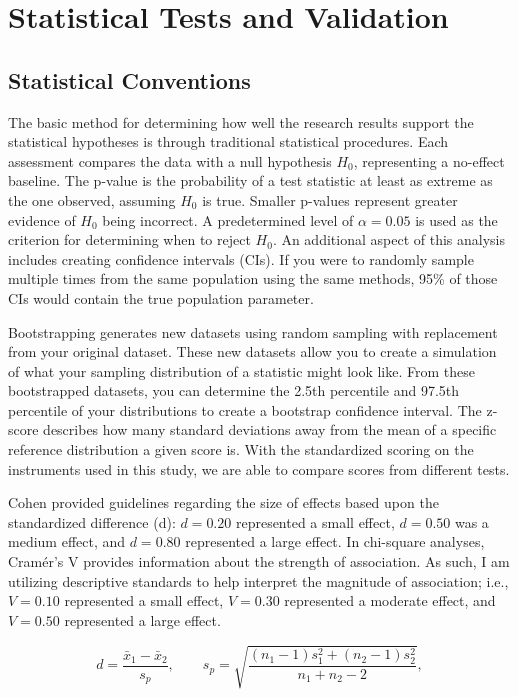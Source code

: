 \section{Statistical Tests and Validation}\label{sec:stats}

\subsection{Statistical Conventions}
The basic method for determining how well the research results support the statistical hypotheses is through traditional statistical procedures. Each assessment compares the data with a null hypothesis \(H_0\), representing a no-effect baseline. The p-value is the probability of a test statistic at least as extreme as the one observed, assuming \(H_0\) is true. Smaller p-values represent greater evidence of \(H_0\) being incorrect. A predetermined level of \(\alpha = 0.05\) is used as the criterion for determining when to reject \(H_0\). An additional aspect of this analysis includes creating confidence intervals (CIs). If you were to randomly sample multiple times from the same population using the same methods, 95\% of those CIs would contain the true population parameter.

Bootstrapping generates new datasets using random sampling with replacement from your original dataset. These new datasets allow you to create a simulation of what your sampling distribution of a statistic might look like. From these bootstrapped datasets, you can determine the 2.5th percentile and 97.5th percentile of your distributions to create a bootstrap confidence interval. The z-score describes how many standard deviations away from the mean of a specific reference distribution a given score is. With the standardized scoring on the instruments used in this study, we are able to compare scores from different tests.

Cohen provided guidelines regarding the size of effects based upon the standardized difference (d): \(d = 0.20\) represented a small effect, \(d = 0.50\) was a medium effect, and \(d = 0.80\) represented a large effect. In chi-square analyses, Cramér's V provides information about the strength of association. As such, I am utilizing descriptive standards to help interpret the magnitude of association; i.e., \(V = 0.10\) represented a small effect, \(V = 0.30\) represented a moderate effect, and \(V = 0.50\) represented a large effect.

\begin{equation}\label{eq:cohend}
d=\frac{\bar{x}_1-\bar{x}_2}{s_p},\qquad s_p=\sqrt{\frac{(n_1-1)s_1^2+(n_2-1)s_2^2}{n_1+n_2-2}},
\end{equation}


